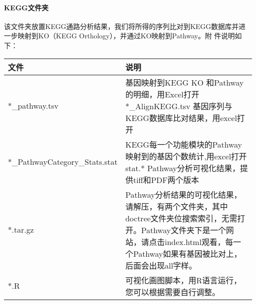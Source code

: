 \paragraph{KEGG文件夹}
该文件夹放置KEGG通路分析结果，我们将所得的序列比对到KEGG数据库并进一步映射到KO（KEGG Orthology），并通过KO映射到Pathway。附
件说明如下：
\begin{table}[H]
        \begin{center}
            \begin{threeparttable}
                \begin{tabularx}{\textwidth}{XX}

                    \toprule
                    \bfseries{文件}                  &\bfseries{说明}\\
                    \midrule
                    *\_pathway.tsv                  &基因映射到KEGG KO 和Pathway的明细，用Excel打开
                    *\_AlignKEGG.tsv 基因序列与KEGG数据库比对结果，用excel打开\\
                    *\_PathwayCategory\_Stats.stat                      &KEGG每一个功能模块的Pathway映射到的基因个数统计,用excel打开stat.*  Pathway分析可视化结果，提供tiff和PDF两个版本\\
                    *.tar.gz                                            &Pathway分析结果的可视化结果，请解压，有两个文件夹，其中doctree文件夹位搜索索引，无需打开。Pathway文件夹下是一个网站，请点击index.html观看，每一个Pathway如果有基因被比对上，后面会出现all字样。\\
                    *.R                                                 &可视化画图脚本，用R语言运行，您可以根据需要自行调整。\\
                    \bottomrule

                \end{tabularx}

            \end{threeparttable}
        \end{center}
\end{table}

